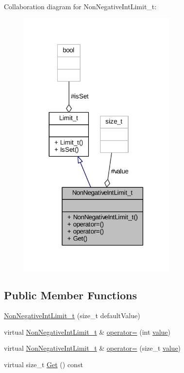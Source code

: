 Collaboration diagram for Non\+Negative\+Int\+Limit\+\_\+t\+:
\nopagebreak
\begin{figure}[H]
\begin{center}
\leavevmode
\includegraphics[width=225pt]{class_non_negative_int_limit__t__coll__graph}
\end{center}
\end{figure}
\subsection*{Public Member Functions}
\begin{DoxyCompactItemize}
\item 
\hyperlink{class_non_negative_int_limit__t_a6839856340b6824538e75ba042571a0f}{Non\+Negative\+Int\+Limit\+\_\+t} (size\+\_\+t default\+Value)
\item 
virtual \hyperlink{class_non_negative_int_limit__t}{Non\+Negative\+Int\+Limit\+\_\+t} \& \hyperlink{class_non_negative_int_limit__t_a7fb5f8533df9f51be15a0a5e5e4af566}{operator=} (int \hyperlink{class_non_negative_int_limit__t_ac6fe50d9fcbdaf452a31178bfa2dff56}{value})
\item 
virtual \hyperlink{class_non_negative_int_limit__t}{Non\+Negative\+Int\+Limit\+\_\+t} \& \hyperlink{class_non_negative_int_limit__t_a2e659ee7fc21e453c5d56cda6ef30cb8}{operator=} (size\+\_\+t \hyperlink{class_non_negative_int_limit__t_ac6fe50d9fcbdaf452a31178bfa2dff56}{value})
\item 
virtual size\+\_\+t \hyperlink{class_non_negative_int_limit__t_a3b75665bfc87d5439d4bfa4319a5218f}{Get} () const 
\end{DoxyCompactItemize}
